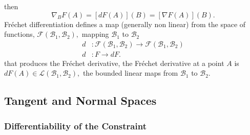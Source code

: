 \documentclass[aps,preprint]{revtex4}%
\begin{document}
then
\begin{equation}
\nabla_{B}F\left(  A\right)  =\left[  dF\left(  A\right)  \right]  \left(
B\right)  =\left[  \nabla F\left(  A\right)  \right]  \left(  B\right)  .
\end{equation}
Fr\'{e}chet differentiation defines a map (generally non linear) from the
space of functions, $\mathcal{F}\left(  \mathcal{B}_{1},\mathcal{B}%
_{2}\right)  ,$ mapping $\mathcal{B}_{1}$ to $\mathcal{B}_{2}$
\begin{align}
d  &  :\mathcal{F}\left(  \mathcal{B}_{1},\mathcal{B}_{2}\right)
\rightarrow\mathcal{F}\left(  \mathcal{B}_{1},\mathcal{B}_{2}\right)
\nonumber\\
d  &  :F\rightarrow dF.
\end{align}
that produces the Fr\'{e}chet derivative, the Fr\'{e}chet derivative at a
point $A$ is $dF\left(  A\right)  \in\mathcal{L}\left(  \mathcal{B}%
_{1},\mathcal{B}_{2}\right)  ,$ the bounded linear maps from $\mathcal{B}_{1}$
to $\mathcal{B}_{2}.$

\subsection{Tangent and Normal Spaces \label{TanNorm}}

\subsubsection{Differentiability of the Constraint}
\end{document}
